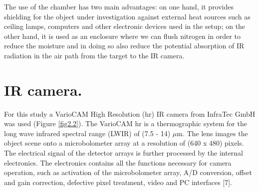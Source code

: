 		The use of the chamber has two main advantages: on one hand, it provides shielding for the object under investigation against external heat sources such as ceiling lamps, computers and other electronic devices used in the setup; on the other hand, it is used as an enclosure where we can flush nitrogen in order to reduce the moisture and in doing so also reduce the potential absorption of IR radiation in the air path from the target to the IR camera.
		
	\section{IR camera.}\label{section2.2}
	
		For this study a VarioCAM High Resolution (hr) IR camera from InfraTec GmbH was used (Figure \ref{fig2.2}). The VarioCAM \textregistered\space hr is a thermographic system for the long wave infrared spectral range (LWIR) of (7.5 - 14) $\mu$m. The lens images the object scene onto a microbolometer array at a resolution of (640 x 480) pixels. The electrical signal of the detector arrays is further processed by the internal electronics. The electronics contains all the functions necessary for camera operation, such as activation of the microbolometer array, A/D conversion, offset and gain correction, defective pixel treatment, video and PC interfaces [7].
		
